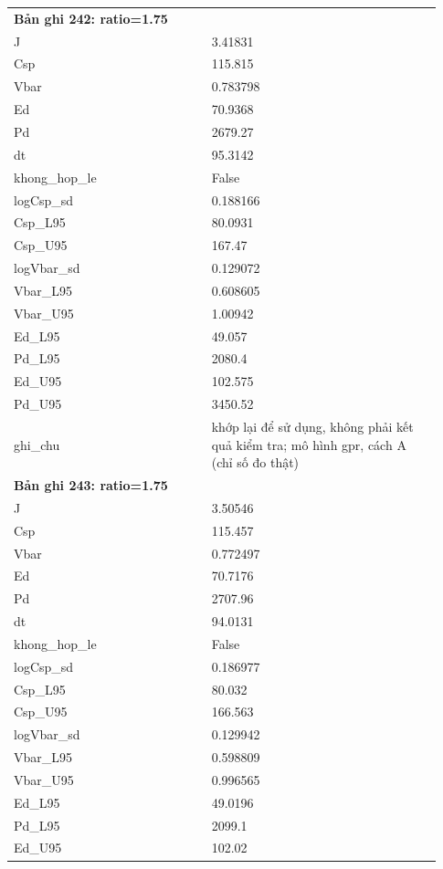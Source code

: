 \begin{longtable}{p{0.43\linewidth}p{0.50\linewidth}}
\midrule
\multicolumn{2}{p{0.95\linewidth}}{\textbf{Bản ghi 242: ratio=1.75}} \\
J & 3.41831 \\
Csp & 115.815 \\
Vbar & 0.783798 \\
Ed & 70.9368 \\
Pd & 2679.27 \\
dt & 95.3142 \\
khong\_\allowbreak hop\_\allowbreak le & False \\
logCsp\_\allowbreak sd & 0.188166 \\
Csp\_\allowbreak L95 & 80.0931 \\
Csp\_\allowbreak U95 & 167.47 \\
logVbar\_\allowbreak sd & 0.129072 \\
Vbar\_\allowbreak L95 & 0.608605 \\
Vbar\_\allowbreak U95 & 1.00942 \\
Ed\_\allowbreak L95 & 49.057 \\
Pd\_\allowbreak L95 & 2080.4 \\
Ed\_\allowbreak U95 & 102.575 \\
Pd\_\allowbreak U95 & 3450.52 \\
ghi\_\allowbreak chu & khớp lại để sử dụng, không phải kết quả kiểm tra; mô hình gpr, cách A (chỉ số đo thật) \\
\midrule
\multicolumn{2}{p{0.95\linewidth}}{\textbf{Bản ghi 243: ratio=1.75}} \\
J & 3.50546 \\
Csp & 115.457 \\
Vbar & 0.772497 \\
Ed & 70.7176 \\
Pd & 2707.96 \\
dt & 94.0131 \\
khong\_\allowbreak hop\_\allowbreak le & False \\
logCsp\_\allowbreak sd & 0.186977 \\
Csp\_\allowbreak L95 & 80.032 \\
Csp\_\allowbreak U95 & 166.563 \\
logVbar\_\allowbreak sd & 0.129942 \\
Vbar\_\allowbreak L95 & 0.598809 \\
Vbar\_\allowbreak U95 & 0.996565 \\
Ed\_\allowbreak L95 & 49.0196 \\
Pd\_\allowbreak L95 & 2099.1 \\
Ed\_\allowbreak U95 & 102.02 \\

\end{longtable}
